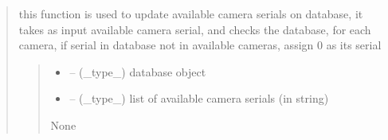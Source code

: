 \documentclass[letterpaper,10pt,english]{sphinxmanual}
\begin{document}
\begin{quote}

\begin{savenotes}\begin{fulllineitems}
\label{\detokenize{setting/backend/camera_funcs:oxin.backend.camera_funcs.update_available_camera_serials_on_db}}
\pysigstartsignatures
{}
\pysigstopsignatures
\sphinxAtStartPar
this function is used to update available camera serials on database,
it takes as input available camera serial, and checks the database,
for each camera, if serial in database not in available cameras, assign 0 as its serial
\begin{quote}\begin{description}
\begin{itemize}
\item {} 
\sphinxAtStartPar
{} – (\_type\_) database object

\item {} 
\sphinxAtStartPar
{} – (\_type\_) list of available camera serials (in string)

\end{itemize}

\sphinxAtStartPar
None

\end{description}\end{quote}

\end{fulllineitems}\end{savenotes}



\end{quote}
\end{document}
